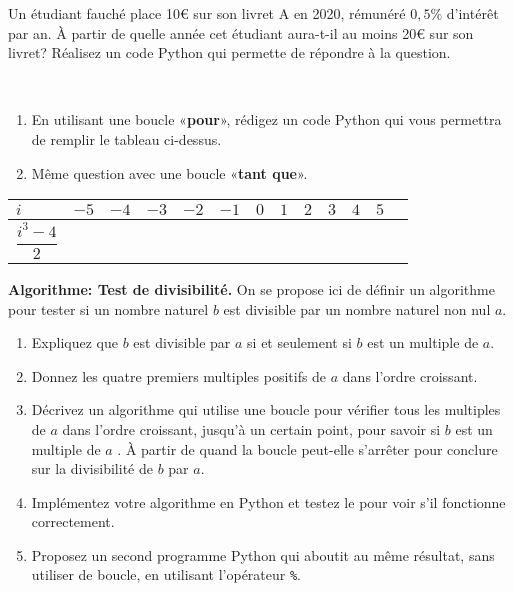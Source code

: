 \begin{exercise}
	Un étudiant fauché place 10€ sur son livret A en 2020, rémunéré $0,5\%$ d'intérêt par an. À partir de quelle année cet étudiant aura-t-il au moins 20€ sur son livret? Réalisez un code Python qui permette de répondre à la question.
\end{exercise}

\begin{exercise}~
	\begin{enumerate}
		\item En utilisant une boucle «{\ttfamily\bf pour}», rédigez un code Python qui vous permettra de remplir le tableau ci-dessus.
		\item Même question avec une boucle «{\ttfamily\bf tant que}».
	\end{enumerate}
\begin{center}
\begin{tabular}{|C{1.2cm}|C{.7cm}|C{.7cm}|C{.7cm}|C{.7cm}|C{.7cm}|C{.7cm}|C{.7cm}|C{.7cm}|C{.7cm}|C{.7cm}|C{.7cm}|N}
	\hline
	$i$&$-5$&$-4$&$-3$&$-2$&$-1$&$0$&$1$&$2$&$3$&$4$&$5$&\\[15pt]\hline
	$\dfrac{i^3-4}{2}$&&&&&&&&&&&&\\[15pt]\hline
\end{tabular}
\end{center}
\end{exercise}

\begin{exercise}
	\textbf{Algorithme: Test de divisibilité.} On se propose ici de définir un algorithme pour tester si un nombre naturel $b$ est divisible par un nombre naturel non nul $a$.
	\begin{enumerate}
		\item Expliquez que $b$ est divisible par $a$ si et seulement si $b$ est un multiple de $a$.
		\item Donnez les quatre premiers multiples positifs de $a$ dans l'ordre croissant.
		\item Décrivez un algorithme qui utilise une boucle pour vérifier tous les multiples de $a$ dans l'ordre croissant, jusqu'à un certain point, pour savoir si $b$ est un multiple de $a$ . À partir de quand la boucle peut-elle s'arrêter pour conclure sur la divisibilité de $b$ par $a$.
		\item Implémentez votre algorithme en Python et testez le pour voir s'il fonctionne correctement.
		\item Proposez un second programme Python qui aboutit au même résultat, sans utiliser de boucle, en utilisant l'opérateur \texttt{\%}.
	\end{enumerate}
\end{exercise}


